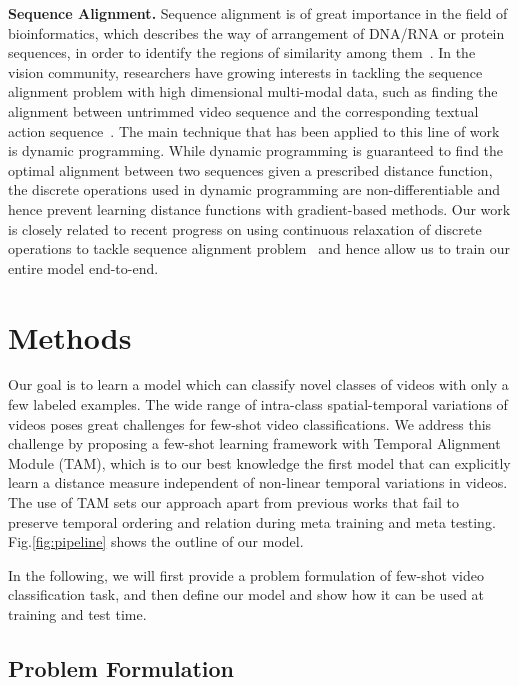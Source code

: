 \documentclass[10pt,twocolumn,letterpaper]{article}
\begin{document}
\noindent \textbf{Sequence Alignment.}
Sequence alignment is of great importance in the field of bioinformatics, which describes the way of arrangement of DNA/RNA or protein sequences, in order to identify the regions of similarity among them~\cite{altschul1997gapped}. In the vision community, researchers have growing interests in tackling the sequence alignment problem with high dimensional multi-modal data, such as finding the alignment between untrimmed video sequence and the corresponding textual action sequence~\cite{chang2019d, dogan2018neural,richard2018neuralnetwork}. The main technique that has been applied to this line of work is dynamic programming. While dynamic programming is guaranteed to find the optimal alignment between two sequences given a prescribed distance function, the discrete operations used in dynamic programming are non-differentiable and hence prevent learning distance functions with gradient-based methods. Our work is closely related to recent progress on using continuous relaxation of discrete operations to tackle sequence alignment problem~\cite{chang2019d} and hence allow us to train our entire model end-to-end. 




\section{Methods}


Our goal is to learn a model which can classify novel classes of videos with only a few labeled examples. The wide range of intra-class spatial-temporal variations of videos poses great challenges for few-shot video classifications. We address this challenge by proposing a few-shot learning framework with Temporal Alignment Module (TAM), which is to our best knowledge the first model that can explicitly learn a distance measure independent of non-linear temporal variations in videos. The use of TAM sets our approach apart from previous works that fail to preserve temporal ordering and relation during meta training and meta testing. Fig.\ref{fig:pipeline} shows the outline of our model. 

In the following, we will first provide a problem formulation of few-shot video classification task, and then define our model and show how it can be used at training and test time. 

\subsection{Problem Formulation}
\end{document}
